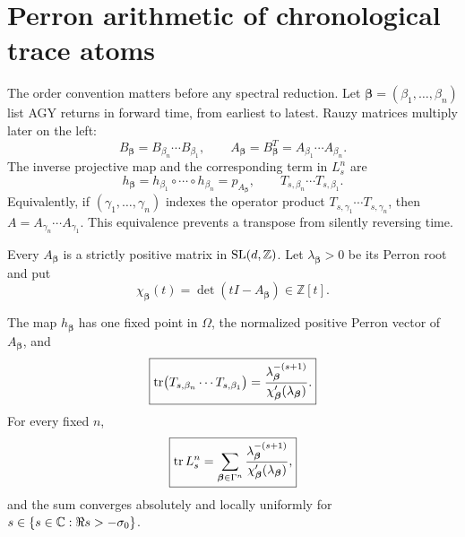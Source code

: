 \section{Perron arithmetic of chronological trace atoms}
\label{sec:perron-trace}

The order convention matters before any spectral reduction.  Let
\(\boldsymbol\beta=(\beta_1,\ldots,\beta_n)\) list AGY returns in forward
time, from earliest to latest.  Rauzy matrices multiply later on the left:
\begin{equation}
 B_{\boldsymbol\beta}
 =B_{\beta_n}\cdots B_{\beta_1},
 \qquad
 A_{\boldsymbol\beta}=B_{\boldsymbol\beta}^T
 =A_{\beta_1}\cdots A_{\beta_n}.
 \label{eq:chronological-matrices}
\end{equation}
The inverse projective map and the corresponding term in \(L_s^n\) are
\begin{equation}
 h_{\boldsymbol\beta}
 =h_{\beta_1}\circ\cdots\circ h_{\beta_n}
 =p_{A_{\boldsymbol\beta}},
 \qquad
 T_{s,\beta_n}\cdots T_{s,\beta_1}.
 \label{eq:chronological-operators}
\end{equation}
Equivalently, if \((\gamma_1,\ldots,\gamma_n)\) indexes the operator product
\(T_{s,\gamma_1}\cdots T_{s,\gamma_n}\), then
\(A=A_{\gamma_n}\cdots A_{\gamma_1}\).  This equivalence prevents a
transpose from silently reversing time.

Every \(A_{\boldsymbol\beta}\) is a strictly positive matrix in
\(\operatorname{SL}(d,\mathbb Z)\).  Let \(\lambda_{\boldsymbol\beta}>0\) be its Perron
root and put
\begin{equation}
 \chi_{\boldsymbol\beta}(t)
 =\det(tI-A_{\boldsymbol\beta})\in\mathbb Z[t].
 \label{eq:word-characteristic}
\end{equation}

\begin{theorem}
\label{thm:perron-trace}
The map \(h_{\boldsymbol\beta}\) has one fixed point in \(\Omega\), the
normalized positive Perron vector of \(A_{\boldsymbol\beta}\), and
\begin{equation}
 \boxed{
 \operatorname{tr}\bigl(T_{s,\beta_n}\cdots T_{s,\beta_1}\bigr)
 =\frac{\lambda_{\boldsymbol\beta}^{-(s+1)}}
 {\chi_{\boldsymbol\beta}'(\lambda_{\boldsymbol\beta})}.}
 \label{eq:perron-atom}
\end{equation}
For every fixed \(n\),
\begin{equation}
 \boxed{
 \operatorname{tr} L_s^n
 =\sum_{\boldsymbol\beta\in\Gamma^n}
 \frac{\lambda_{\boldsymbol\beta}^{-(s+1)}}
 {\chi_{\boldsymbol\beta}'(\lambda_{\boldsymbol\beta})},}
 \label{eq:word-trace-sum}
\end{equation}
and the sum converges absolutely and locally uniformly for
\(s\in\{s\in\mathbb{C}:\Re s>-\sigma_0\}\).
\end{theorem}

